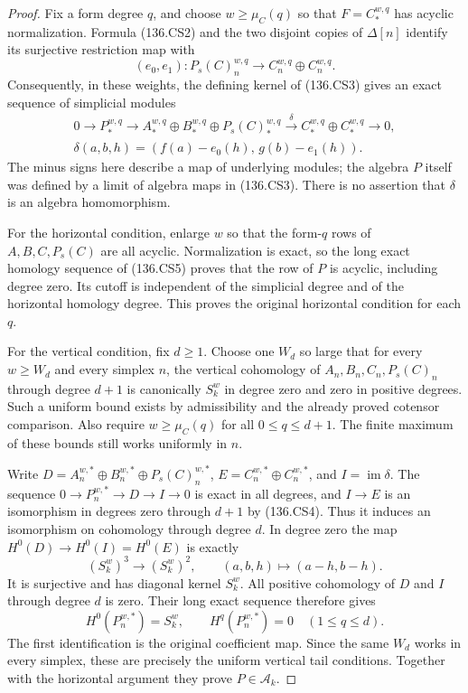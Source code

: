 \begin{proof}
Fix a form degree $q$, and choose $w\ge\mu_C(q)$ so that
$F=C_*^{w,q}$ has acyclic normalization. Formula (136.CS2)
and the two disjoint copies of $\Delta[n]$ identify its
surjective restriction map with
\[
       (e_0,e_1):P_s(C)_n^{w,q}
                           \longrightarrow C_n^{w,q}\oplus C_n^{w,q}.
                                                               \tag{136.CS4}
\]
Consequently, in these weights, the defining kernel of
(136.CS3) gives an exact sequence of simplicial modules
\[
 \begin{gathered}
 0\longrightarrow P_*^{w,q}\longrightarrow
       A_*^{w,q}\oplus B_*^{w,q}\oplus P_s(C)_*^{w,q}
       \xrightarrow{\delta}
       C_*^{w,q}\oplus C_*^{w,q}\longrightarrow0,\\
       \delta(a,b,h)=(f(a)-e_0(h),\,g(b)-e_1(h)).
 \end{gathered}                                            \tag{136.CS5}
\]
The minus signs here describe a map of underlying modules;
the algebra $P$ itself was defined by a limit of algebra
maps in (136.CS3). There is no assertion that $\delta$ is
an algebra homomorphism.

For the horizontal condition, enlarge $w$ so that the
form-$q$ rows of $A,B,C,P_s(C)$ are all acyclic.
Normalization is exact, so the long exact homology sequence
of (136.CS5) proves that the row of $P$ is acyclic, including
degree zero. Its cutoff is independent of the simplicial
degree and of the horizontal homology degree. This proves
the original horizontal condition for each $q$.

For the vertical condition, fix $d\ge1$. Choose one $W_d$
so large that for every $w\ge W_d$ and every simplex $n$,
the vertical cohomology of $A_n,B_n,C_n,P_s(C)_n$ through
degree $d+1$ is canonically $S_k^w$ in degree zero and zero
in positive degrees. Such a uniform bound exists by
admissibility and the already proved cotensor comparison.
Also require $w\ge\mu_C(q)$ for all $0\le q\le d+1$.
The finite maximum of these bounds still works uniformly
in $n$.

Write $D=A_n^{w,*}\oplus B_n^{w,*}\oplus P_s(C)_n^{w,*}$,
$E=C_n^{w,*}\oplus C_n^{w,*}$, and $I=\operatorname{im}\delta$.
The sequence $0\to P_n^{w,*}\to D\to I\to0$ is exact
in all degrees, and $I\to E$ is an isomorphism in degrees
zero through $d+1$ by (136.CS4). Thus it induces an
isomorphism on cohomology through degree $d$.
In degree zero the map $H^0(D)\to H^0(I)=H^0(E)$ is
exactly
\[
             (S_k^w)^3\longrightarrow(S_k^w)^2,
                       \qquad (a,b,h)\longmapsto(a-h,b-h).
                                                               \tag{136.CS6}
\]
It is surjective and has diagonal kernel $S_k^w$.
All positive cohomology of $D$ and $I$ through degree $d$
is zero. Their long exact sequence therefore gives
\[
           H^0(P_n^{w,*})=S_k^w,\qquad
           H^q(P_n^{w,*})=0\quad(1\le q\le d).            \tag{136.CS7}
\]
The first identification is the original coefficient map.
Since the same $W_d$ works in every simplex, these are
precisely the uniform vertical tail conditions.
Together with the horizontal argument they prove
$P\in\mathcal A_k$.
\end{proof}

